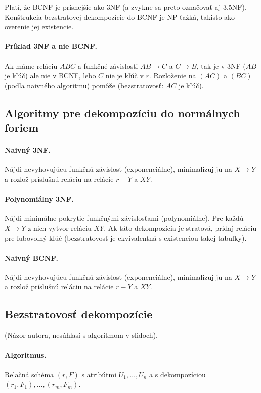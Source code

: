 \documentclass[10pt,a4paper]{article}
\begin{document}
Platí, že BCNF je prísnejšie ako 3NF (a zvykne sa preto označovať aj 3.5NF).
Konštrukcia bezstratovej dekompozície do BCNF je NP ťažká, takisto ako overenie jej existencie.

\paragraph{Príklad 3NF a nie BCNF.}
Ak máme reláciu $ABC$ a funkčné závislosti $AB \rightarrow C$ a $C \rightarrow B$,
tak je v 3NF ($AB$ je kľúč) ale nie v BCNF, lebo $C$ nie je kľúč v $r$. Rozloženie na $(AC)$ a $(BC)$ (podľa naivného algoritmu) pomôže (bezstratovosť: $AC$ je kľúč).

\subsection{Algoritmy pre dekompozíciu do normálnych foriem}

\paragraph{Naivný 3NF.} Nájdi nevyhovujúcu funkčnú závislosť (exponenciálne), minimalizuj ju na $X \rightarrow Y$ a rozlož príslušnú reláciu na relácie $r-Y$ a $XY$.

\paragraph{Polynomiálny 3NF.} Nájdi minimálne pokrytie funkčnými závislosťami (polynomiálne). Pre každú $X \rightarrow Y$ z nich vytvor reláciu $XY$. Ak táto dekompozícia je stratová, pridaj reláciu pre ľubovoľný kľúč (bezstratovosť je ekvivalentná s existenciou takej tabuľky).

\paragraph{Naivný BCNF.} Nájdi nevyhovujúcu funkčnú závislosť (exponenciálne), minimalizuj ju na $X \rightarrow Y$ a rozlož príslušnú reláciu na relácie $r-Y$ a $XY$.

\subsection{Bezstratovosť dekompozície}
(Názor autora, nesúhlasí s algoritmom v slidoch).

\paragraph{Algoritmus.}
Relačná schéma $(r,F)$ s atribútmi $U_1,\ldots,U_n$ a s dekompozíciou $(r_1, F_1),\ldots,(r_m, F_m)$.
\end{document}
